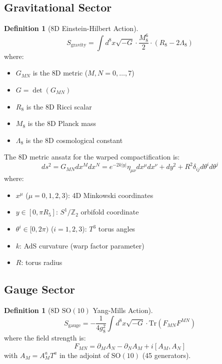 \documentclass[11pt,a4paper]{article}
\theoremstyle{plain}
\theoremstyle{definition}
\newtheorem{definition}[theorem]{Definition}
\theoremstyle{remark}
\newcommand{\Tthree}{T^3}
\newcommand{\Ztwo}{\mathbb{Z}_2}
\newcommand{\SOten}{\text{SO}(10)}
\begin{document}
\subsection{Gravitational Sector}

\begin{definition}[8D Einstein-Hilbert Action]
\begin{equation}
S_{\text{gravity}} = \int d^8x \sqrt{-G} \cdot \frac{M_8^6}{2} \cdot (R_8 - 2\Lambda_8)
\end{equation}
where:
\begin{itemize}
  \item $G_{MN}$ is the 8D metric ($M,N = 0,\ldots,7$)
  \item $G = \det(G_{MN})$
  \item $R_8$ is the 8D Ricci scalar
  \item $M_8$ is the 8D Planck mass
  \item $\Lambda_8$ is the 8D cosmological constant
\end{itemize}
\end{definition}

The 8D metric ansatz for the warped compactification is:
\begin{equation}
ds^2 = G_{MN}dx^M dx^N = e^{-2k|y|}\eta_{\mu\nu}dx^\mu dx^\nu + dy^2 + R^2 \delta_{ij}d\theta^i d\theta^j
\end{equation}
where:
\begin{itemize}
  \item $x^\mu$ ($\mu = 0,1,2,3$): 4D Minkowski coordinates
  \item $y \in [0, \pi R_5]$: $S^1/\Ztwo$ orbifold coordinate
  \item $\theta^i \in [0, 2\pi)$ ($i = 1,2,3$): $\Tthree$ torus angles
  \item $k$: AdS curvature (warp factor parameter)
  \item $R$: torus radius
\end{itemize}

\subsection{Gauge Sector}

\begin{definition}[8D $\SOten$ Yang-Mills Action]
\begin{equation}
S_{\text{gauge}} = -\frac{1}{4g_8^2} \int d^8x \sqrt{-G} \cdot \text{Tr}(F_{MN}F^{MN})
\end{equation}
where the field strength is:
\begin{equation}
F_{MN} = \partial_M A_N - \partial_N A_M + i[A_M, A_N]
\end{equation}
with $A_M = A_M^a T^a$ in the adjoint of $\SOten$ (45 generators).
\end{definition}
\end{document}
